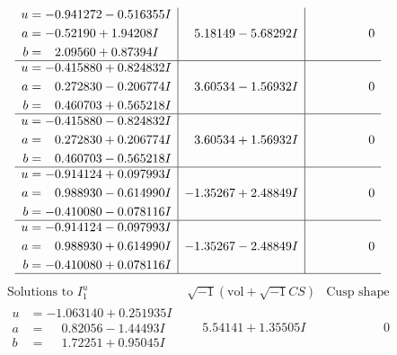 \documentclass[1p]{elsarticle_modified}
\theoremstyle{definition}
\newcommand{\I}{\sqrt{-1}}
\begin{document}
$$\begin{array}{c|c|c}
\begin{aligned}
u &= -0.941272 - 0.516355 I \\
a &= -0.52190 + 1.94208 I \\
b &= \phantom{-}2.09560 + 0.87394 I\end{aligned}
 & \phantom{-}5.18149 - 5.68292 I & \phantom{-0.000000 } 0 \\ \hline\begin{aligned}
u &= -0.415880 + 0.824832 I \\
a &= \phantom{-}0.272830 - 0.206774 I \\
b &= \phantom{-}0.460703 + 0.565218 I\end{aligned}
 & \phantom{-}3.60534 - 1.56932 I & \phantom{-0.000000 } 0 \\ \hline\begin{aligned}
u &= -0.415880 - 0.824832 I \\
a &= \phantom{-}0.272830 + 0.206774 I \\
b &= \phantom{-}0.460703 - 0.565218 I\end{aligned}
 & \phantom{-}3.60534 + 1.56932 I & \phantom{-0.000000 } 0 \\ \hline\begin{aligned}
u &= -0.914124 + 0.097993 I \\
a &= \phantom{-}0.988930 - 0.614990 I \\
b &= -0.410080 - 0.078116 I\end{aligned}
 & -1.35267 + 2.48849 I & \phantom{-0.000000 } 0 \\ \hline\begin{aligned}
u &= -0.914124 - 0.097993 I \\
a &= \phantom{-}0.988930 + 0.614990 I \\
b &= -0.410080 + 0.078116 I\end{aligned}
 & -1.35267 - 2.48849 I & \phantom{-0.000000 } 0\\
 \hline 
 \end{array}$$\newpage$$\begin{array}{c|c|c}  
\text{Solutions to }I^u_{1}& \I (\text{vol} + \sqrt{-1}CS) & \text{Cusp shape}\\
 \hline 
\begin{aligned}
u &= -1.063140 + 0.251935 I \\
a &= \phantom{-}0.82056 - 1.44493 I \\
b &= \phantom{-}1.72251 + 0.95045 I\end{aligned}
 & \phantom{-}5.54141 + 1.35505 I & \phantom{-0.000000 } 0 \\ \hline\begin{aligned}

\end{aligned}
\end{array}$$
\end{document}
